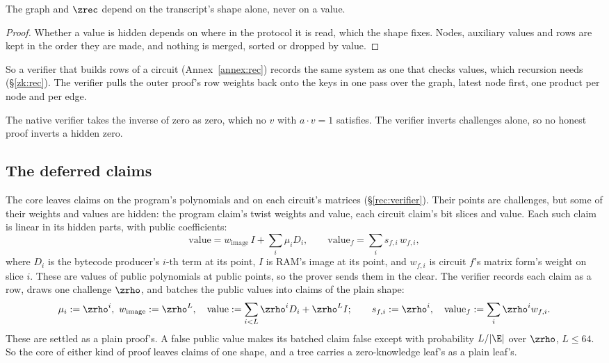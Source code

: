 \begin{lemma}\label{lem:zk-shape}
The graph and $\zrec$ depend on the transcript's shape alone, never on a value.
\end{lemma}
\begin{proof}
Whether a value is hidden depends on where in the protocol it is read, which the shape fixes. Nodes, auxiliary values and rows are kept in the order they are made, and nothing is merged, sorted or dropped by value.
\end{proof}

So a verifier that builds rows of a circuit (Annex~\ref{annex:rec}) records the same system as one that checks values, which recursion needs (\S\ref{zk:rec}). The verifier pulls the outer proof's row weights back onto the keys in one pass over the graph, latest node first, one product per node and per edge.

The native verifier takes the inverse of zero as zero, which no $v$ with $a \cdot v = 1$ satisfies. The verifier inverts challenges alone, so no honest proof inverts a hidden zero.

\subsection{The deferred claims}\label{zk:deferred}

The core leaves claims on the program's polynomials and on each circuit's matrices (\S\ref{rec:verifier}). Their points are challenges, but some of their weights and values are hidden: the program claim's twist weights and value, each circuit claim's bit slices and value. Each such claim is linear in its hidden parts, with public coefficients:
\[
\mathrm{value} = w_{\mathrm{image}}\, I + \sum_i \mu_i D_i, \qquad \mathrm{value}_f = \sum_i s_{f,i}\, w_{f,i},
\]
where $D_i$ is the bytecode producer's $i$-th term at its point, $I$ is RAM's image at its point, and $w_{f,i}$ is circuit $f$'s matrix form's weight on slice $i$. These are values of public polynomials at public points, so the prover sends them in the clear. The verifier records each claim as a row, draws one challenge $\zrho$, and batches the public values into claims of the plain shape:
\[
\mu_i := \zrho^i,\ w_{\mathrm{image}} := \zrho^{L}, \quad \mathrm{value} := \sum_{i < L} \zrho^i D_i + \zrho^L I; \qquad s_{f,i} := \zrho^i, \quad \mathrm{value}_f := \sum_i \zrho^i w_{f,i}.
\]
These are settled as a plain proof's. A false public value makes its batched claim false except with probability $L/|\E|$ over $\zrho$, $L \le 64$. So the core of either kind of proof leaves claims of one shape, and a tree carries a zero-knowledge leaf's as a plain leaf's.

